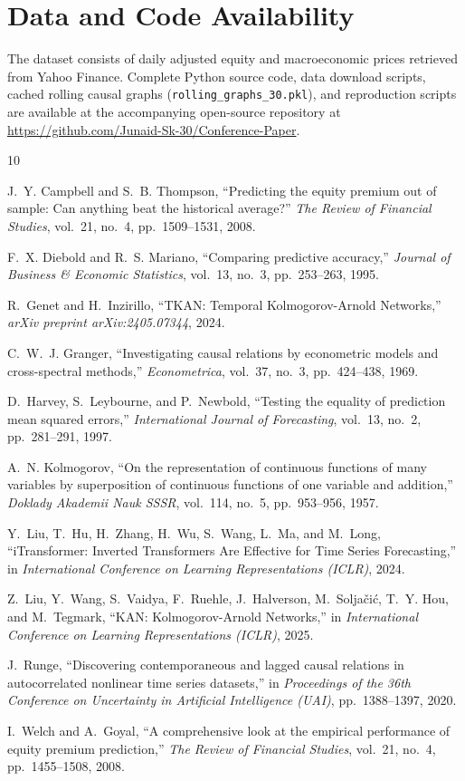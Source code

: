 \documentclass[10pt,twocolumn,a4paper]{article}
\begin{document}
\section*{Data and Code Availability}
The dataset consists of daily adjusted equity and macroeconomic prices retrieved from Yahoo Finance. Complete Python source code, data download scripts, cached rolling causal graphs (\texttt{rolling\_graphs\_30.pkl}), and reproduction scripts are available at the accompanying open-source repository at \url{https://github.com/Junaid-Sk-30/Conference-Paper}.

\begin{thebibliography}{10}

J.~Y. Campbell and S.~B. Thompson, ``Predicting the equity premium out of sample: Can anything beat the historical average?'' \emph{The Review of Financial Studies}, vol.~21, no.~4, pp.~1509--1531, 2008.

F.~X. Diebold and R.~S. Mariano, ``Comparing predictive accuracy,'' \emph{Journal of Business \& Economic Statistics}, vol.~13, no.~3, pp.~253--263, 1995.

R.~Genet and H.~Inzirillo, ``TKAN: Temporal Kolmogorov-Arnold Networks,'' \emph{arXiv preprint arXiv:2405.07344}, 2024.

C.~W.~J. Granger, ``Investigating causal relations by econometric models and cross-spectral methods,'' \emph{Econometrica}, vol.~37, no.~3, pp.~424--438, 1969.

D.~Harvey, S.~Leybourne, and P.~Newbold, ``Testing the equality of prediction mean squared errors,'' \emph{International Journal of Forecasting}, vol.~13, no.~2, pp.~281--291, 1997.

A.~N. Kolmogorov, ``On the representation of continuous functions of many variables by superposition of continuous functions of one variable and addition,'' \emph{Doklady Akademii Nauk SSSR}, vol.~114, no.~5, pp.~953--956, 1957.

Y.~Liu, T.~Hu, H.~Zhang, H.~Wu, S.~Wang, L.~Ma, and M.~Long, ``iTransformer: Inverted Transformers Are Effective for Time Series Forecasting,'' in \emph{International Conference on Learning Representations (ICLR)}, 2024.

Z.~Liu, Y.~Wang, S.~Vaidya, F.~Ruehle, J.~Halverson, M.~Solja{\v{c}}i{\'c}, T.~Y. Hou, and M.~Tegmark, ``KAN: Kolmogorov-Arnold Networks,'' in \emph{International Conference on Learning Representations (ICLR)}, 2025.

J.~Runge, ``Discovering contemporaneous and lagged causal relations in autocorrelated nonlinear time series datasets,'' in \emph{Proceedings of the 36th Conference on Uncertainty in Artificial Intelligence (UAI)}, pp.~1388--1397, 2020.

I.~Welch and A.~Goyal, ``A comprehensive look at the empirical performance of equity premium prediction,'' \emph{The Review of Financial Studies}, vol.~21, no.~4, pp.~1455--1508, 2008.
\end{thebibliography}
\end{document}

